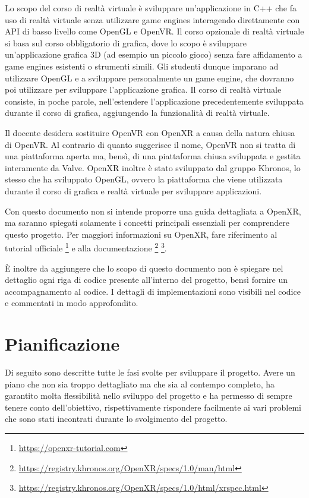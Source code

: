 \documentclass[twoside]{supsistudent}
\begin{document}
Lo scopo del corso di realtà virtuale è sviluppare un'applicazione in C++ che fa uso di realtà virtuale senza utilizzare game engines interagendo direttamente con API di basso livello come OpenGL e OpenVR. Il corso opzionale di realtà virtuale si basa sul corso obbligatorio di grafica, dove lo scopo è sviluppare un'applicazione grafica 3D (ad esempio un piccolo gioco) senza fare affidamento a game engines esistenti o strumenti simili. Gli studenti dunque imparano ad utilizzare OpenGL e a sviluppare personalmente un game engine, che dovranno poi utilizzare per sviluppare l'applicazione grafica. Il corso di realtà virtuale consiste, in poche parole, nell'estendere l'applicazione precedentemente sviluppata durante il corso di grafica, aggiungendo la funzionalità di realtà virtuale.

Il docente desidera sostituire OpenVR con OpenXR a causa della natura chiusa di OpenVR. Al contrario di quanto suggerisce il nome, OpenVR non si tratta di una piattaforma aperta ma, bensì, di una piattaforma chiusa sviluppata e gestita interamente da Valve. OpenXR inoltre è stato sviluppato dal gruppo Khronos, lo stesso che ha sviluppato OpenGL, ovvero la piattaforma che viene utilizzata durante il corso di grafica e realtà virtuale per sviluppare applicazioni.

Con questo documento non si intende proporre una guida dettagliata a OpenXR, ma saranno spiegati solamente i concetti principali essenziali per comprendere questo progetto. Per maggiori informazioni su OpenXR, fare riferimento al tutorial ufficiale \footnote{\url{https://openxr-tutorial.com}} e alla documentazione \footnote{\url{https://registry.khronos.org/OpenXR/specs/1.0/man/html}} \footnote{\url{https://registry.khronos.org/OpenXR/specs/1.0/html/xrspec.html}}.

È inoltre da aggiungere che lo scopo di questo documento non è spiegare nel dettaglio ogni riga di codice presente all'interno del progetto, bensì fornire un accompagnamento al codice. I dettagli di implementazioni sono visibili nel codice e commentati in modo approfondito.

\section{Pianificazione}

Di seguito sono descritte tutte le fasi svolte per sviluppare il progetto. Avere un piano che non sia troppo dettagliato ma che sia al contempo completo, ha garantito molta flessibilità nello sviluppo del progetto e ha permesso di sempre tenere conto dell'obiettivo, rispettivamente rispondere facilmente ai vari problemi che sono stati incontrati durante lo svolgimento del progetto.
\end{document}
